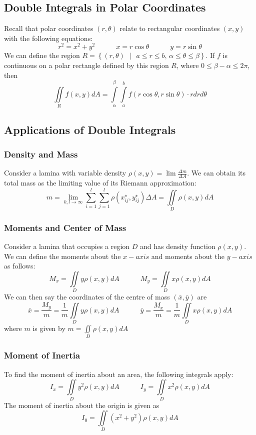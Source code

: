 \documentclass[11pt]{article}
\begin{document}
\subsection{Double Integrals in Polar Coordinates}
Recall that polar coordinates $(r, \theta)$ relate to rectangular coordinates $(x,y)$ with the following equations:
$$r^2 = x^2 + y^2 \quad \quad \quad x = r\cos\theta \quad \quad \quad y = r\sin\theta$$
We can define the region $R = \left\lbrace (r,\theta)\text{ }  | \text{ } a \leq r \leq b \text{, } \alpha \leq \theta \leq \beta \right\rbrace$. If $f$ is continuous on a polar rectangle defined by this region $R$, where $ 0 \leq \beta - \alpha \leq 2\pi $, then $$\iint\limits_{R} f(x,y)dA = \int\limits_{\alpha}^{\beta} \int\limits_{a}^{b} f(r\cos\theta,r\sin\theta)\cdot rdrd\theta$$
\subsection{Applications of Double Integrals}
\subsubsection{Density and Mass}
Consider a lamina with variable density $\rho(x,y) = \lim\frac{\Delta m}{\Delta A}$. We can obtain its total mass as the limiting value of its Riemann approximation:
$$ m = \lim_{k,l \to \infty} \sum_{i=1}^{l} \sum_{j=1}^{l} \rho (x_{ij}^{\star}, y_{ij}^{\star})\Delta A = \iint\limits_{D} \rho(x,y)dA  $$
\subsubsection{Moments and Center of Mass}
Consider a lamina that occupies a region $D$ and has density function $\rho (x,y)$. We can define the moments about the $x-axis$ and moments about the $y-axis$ as follows:
$$M_x = \iint\limits_{D} y\rho (x,y)dA \quad \quad \quad M_y = \iint\limits_{D} x\rho (x,y)dA$$
We can then say the coordinates of the centre of mass $(\bar x , \bar y)$ are  
$$ \bar x = \frac{M_y}{m} = \frac{1}{m}\iint\limits_{D} y\rho (x,y)dA \quad \quad \quad \bar y = \frac{M_x}{m} = \frac{1}{m}\iint\limits_{D} x\rho (x,y)dA$$
where $m$ is given by $m = \iint\limits_{D} \rho (x,y)dA$
\subsubsection{Moment of Inertia}
To find the moment of inertia about an area, the following integrals apply: 
$$I_x = \iint\limits_{D} y^2\rho (x,y)dA \quad \quad \quad I_y = \iint\limits_{D} x^2\rho (x,y)dA$$
The moment of inertia about the origin is given as 
$$ I_0 = \iint\limits_{D} (x^2 + y^2)\rho (x,y)dA$$
\end{document}
